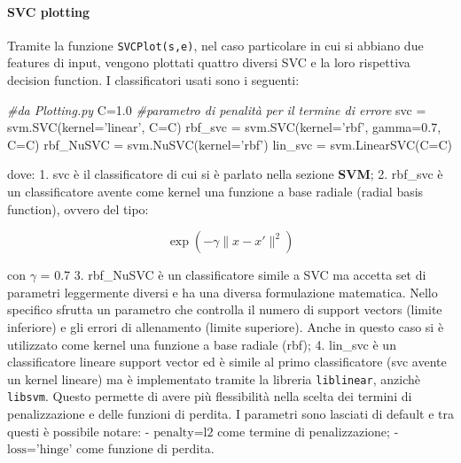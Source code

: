 \documentclass[11pt]{article}
\newenvironment{Shaded}{}{}
\newcommand{\FloatTok}[1]{\textcolor[rgb]{0.25,0.63,0.44}{{#1}}}
\newcommand{\StringTok}[1]{\textcolor[rgb]{0.25,0.44,0.63}{{#1}}}
\newcommand{\CommentTok}[1]{\textcolor[rgb]{0.38,0.63,0.69}{\textit{{#1}}}}
\newcommand{\NormalTok}[1]{{#1}}
\newcommand{\OperatorTok}[1]{\textcolor[rgb]{0.40,0.40,0.40}{{#1}}}
\begin{document}
    \paragraph{SVC plotting}\label{svc-plotting}

    Tramite la funzione \texttt{SVCPlot(s,e)}, nel caso particolare in cui
si abbiano due features di input, vengono plottati quattro diversi SVC e
la loro rispettiva decision function. I classificatori usati sono i
seguenti:

\begin{Shaded}
\begin{Highlighting}[]
\CommentTok{#da Plotting.py}
\NormalTok{C}\OperatorTok{=}\FloatTok{1.0}  \CommentTok{#parametro di penalità per il termine di errore}
\NormalTok{svc }\OperatorTok{=}\NormalTok{ svm.SVC(kernel}\OperatorTok{=}\StringTok{'linear'}\NormalTok{, C}\OperatorTok{=}\NormalTok{C)}
\NormalTok{rbf_svc }\OperatorTok{=}\NormalTok{ svm.SVC(kernel}\OperatorTok{=}\StringTok{'rbf'}\NormalTok{, gamma}\OperatorTok{=}\FloatTok{0.7}\NormalTok{, C}\OperatorTok{=}\NormalTok{C)}
\NormalTok{rbf_NuSVC }\OperatorTok{=}\NormalTok{ svm.NuSVC(kernel}\OperatorTok{=}\StringTok{'rbf'}\NormalTok{)}
\NormalTok{lin_svc }\OperatorTok{=}\NormalTok{ svm.LinearSVC(C}\OperatorTok{=}\NormalTok{C)}
\end{Highlighting}
\end{Shaded}

dove: 1. svc è il classificatore di cui si è parlato nella sezione
\textbf{SVM}; 2. rbf\_svc è un classificatore avente come kernel una
funzione a base radiale (radial basis function), ovvero del tipo:

\begin{equation*}
    \exp(-\gamma \|x-x'\|^2)
    \end{equation*}

con \(\gamma\) = 0.7 3. rbf\_NuSVC è un classificatore simile a SVC ma
accetta set di parametri leggermente diversi e ha una diversa
formulazione matematica. Nello specifico sfrutta un parametro che
controlla il numero di support vectors (limite inferiore) e gli errori
di allenamento (limite superiore). Anche in questo caso si è utilizzato
come kernel una funzione a base radiale (rbf); 4. lin\_svc è un
classificatore lineare support vector ed è simile al primo
classificatore (svc avente un kernel lineare) ma è implementato tramite
la libreria \texttt{liblinear}, anzichè \texttt{libsvm}. Questo permette
di avere più flessibilità nella scelta dei termini di penalizzazione e
delle funzioni di perdita. I parametri sono lasciati di default e tra
questi è possibile notare: - \(\text{penalty=l2}\) come termine di
penalizzazione; - \(\text{loss='hinge'}\) come funzione di perdita.
\end{document}
